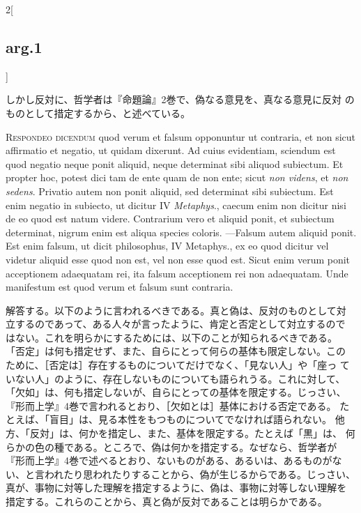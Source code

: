 \documentclass[paper=a4paper,fontsize=10pt,jafontsize=9pt,titlepage]{jlreq}
\begin{document}
\begin{paracol}{2}[\subsection{arg.1}]
\switchcolumn

しかし反対に、哲学者は『命題論』2巻で、偽なる意見を、真なる意見に反対
のものとして措定するから、と述べている。



{\scshape Respondeo dicendum} quod verum et falsum opponuntur ut
 contraria, et non sicut affirmatio et negatio, ut quidam dixerunt. Ad
 cuius evidentiam, sciendum est quod negatio neque ponit aliquid,
 neque determinat sibi aliquod subiectum. Et propter hoc, potest dici
 tam de ente quam de non ente; sicut {\itshape non videns}, et
 {\itshape non sedens}. Privatio autem non ponit aliquid, sed
 determinat sibi subiectum. Est enim negatio in subiecto, ut dicitur
 IV {\itshape Metaphys}., caecum enim non dicitur nisi de eo quod est
 natum videre. Contrarium vero et aliquid ponit, et subiectum
 determinat, nigrum enim est aliqua species coloris. ---Falsum autem
 aliquid ponit. Est enim falsum, ut dicit philosophus, IV Metaphys.,
 ex eo quod dicitur vel videtur aliquid esse quod non est, vel non
 esse quod est. Sicut enim verum ponit acceptionem adaequatam rei, ita
 falsum acceptionem rei non adaequatam. Unde manifestum est quod verum
 et falsum sunt contraria.

\switchcolumn

解答する。以下のように言われるべきである。真と偽は、反対のものとして対
立するのであって、ある人々が言ったように、肯定と否定として対立するので
はない。これを明らかにするためには、以下のことが知られるべきである。
「否定」は何も措定せず、また、自らにとって何らの基体も限定しない。この
ために、［否定は］存在するものについてだけでなく、「見ない人」や「座っ
ていない人」のように、存在しないものについても語られうる。これに対して、
「欠如」は、何も措定しないが、自らにとっての基体を限定する。じっさい、
『形而上学』4巻で言われるとおり、［欠如とは］基体における否定である。
たとえば、「盲目」は、見る本性をもつものについてでなければ語られない。
他方、「反対」は、何かを措定し、また、基体を限定する。たとえば「黒」は、
何らかの色の種である。ところで、偽は何かを措定する。なぜなら、哲学者が
『形而上学』4巻で述べるとおり、ないものがある、あるいは、あるものがな
い、と言われたり思われたりすることから、偽が生じるからである。じっさい、
真が、事物に対等した理解を措定するように、偽は、事物に対等しない理解を
措定する。これらのことから、真と偽が反対であることは明らかである。


\end{paracol}
\end{document}
